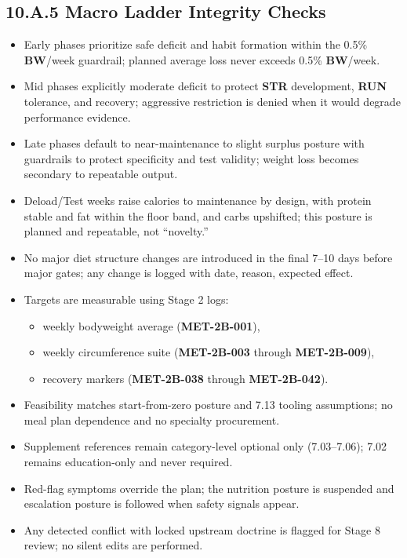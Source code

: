 \documentclass[10pt]{article}
\begin{document}
\newpage
\subsection*{10.A.5 Macro Ladder Integrity Checks}
{}

\begin{itemize}
\item Early phases prioritize safe deficit and habit formation within the 0.5\% \textbf{BW}/week guardrail; planned average loss never exceeds 0.5\% \textbf{BW}/week.
\item Mid phases explicitly moderate deficit to protect \textbf{STR} development, \textbf{RUN} tolerance, and recovery; aggressive restriction is denied when it would degrade performance evidence.
\item Late phases default to near-maintenance to slight surplus posture with guardrails to protect specificity and test validity; weight loss becomes secondary to repeatable output.
\item Deload/Test weeks raise calories to maintenance by design, with protein stable and fat within the floor band, and carbs upshifted; this posture is planned and repeatable, not “novelty.”
\item No major diet structure changes are introduced in the final 7–10 days before major gates; any change is logged with date, reason, expected effect.
\item Targets are measurable using Stage 2 logs:
  \begin{itemize}
  \item weekly bodyweight average (\textbf{MET-2B-001}),
  \item weekly circumference suite (\textbf{MET-2B-003} through \textbf{MET-2B-009}),
  \item recovery markers (\textbf{MET-2B-038} through \textbf{MET-2B-042}).
  \end{itemize}
\item Feasibility matches start-from-zero posture and 7.13 tooling assumptions; no meal plan dependence and no specialty procurement.
\item Supplement references remain category-level optional only (7.03–7.06); 7.02 remains education-only and never required.
\item Red-flag symptoms override the plan; the nutrition posture is suspended and escalation posture is followed when safety signals appear.
\item Any detected conflict with locked upstream doctrine is flagged for Stage 8 review; no silent edits are performed.
\end{itemize}
\end{document}
